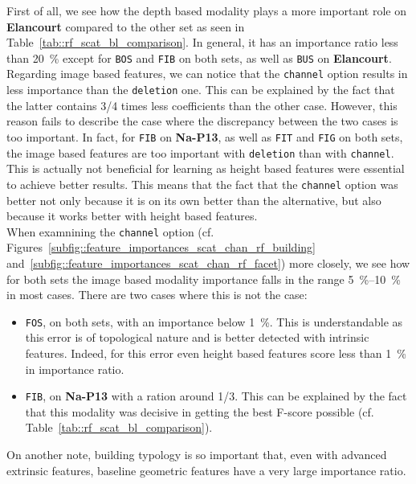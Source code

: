             First of all, we see how the depth based modality plays a more important role on \textbf{Elancourt} compared to the other set as seen in Table~\ref{tab::rf_scat_bl_comparison}.
            In general, it has an importance ratio less than \SI{20}{\percent} except for \texttt{BOS} and \texttt{FIB} on both sets, as well as \texttt{BUS} on \textbf{Elancourt}.\\

            Regarding image based features, we can notice that the \texttt{channel} option results in less importance than the \texttt{deletion} one.
            This can be explained by the fact that the latter contains 3/4 times less coefficients than the other case.
            However, this reason fails to describe the case where the discrepancy between the two cases is too important.
            In fact, for \texttt{FIB} on \textbf{Na-P13}, as well as \texttt{FIT} and \texttt{FIG} on both sets, the image based features are too important with \texttt{deletion} than with \texttt{channel}.
            This is actually not beneficial for learning as height based features were essential to achieve better results.
            This means that the fact that the \texttt{channel} option was better not only because it is on its own better than the alternative, but also because it works better with height based features.\\

            When examnining the \texttt{channel} option (cf. Figures~\ref{subfig::feature_importances_scat_chan_rf_building} and~\ref{subfig::feature_importances_scat_chan_rf_facet}) more closely, we see how for both sets the image based modality importance falls in the range \SIrange{5}{10}{\percent} in most cases.
            There are two cases where this is not the case:
            \begin{itemize}[label=\(\blacktriangleright\)]
                \item \texttt{FOS}, on both sets, with an importance below \SI{1}{\percent}.
                        This is understandable as this error is of topological nature and is better detected with intrinsic features.
                        Indeed, for this error even height based features score less than \SI{1}{\percent} in importance ratio.
                \item \texttt{FIB}, on \textbf{Na-P13} with a ration around \num[fraction-function = \sfrac]{1/3}.
                        This can be explained by the fact that this modality was decisive in getting the best F-score possible (cf. Table~\ref{tab::rf_scat_bl_comparison}).
            \end{itemize}
            On another note, building typology is so important that, even with advanced extrinsic features, baseline geometric features have a very large importance ratio.

